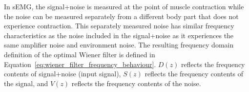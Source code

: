 


In sEMG, the signal+noise is measured at the point of muscle contraction while the noise can be measured separately from a different body part that does not experience contraction. This separately measured noise has similar frequency characteristics as the noise included in the signal+noise as it experiences the same amplifier noise and environment noise. The resulting frequency domain definition of the optimal Wiener filter is defined in Equation~\ref{eq:wiener_filter_frequency_behaviour}\cite{stanford_wiener_filter}. $D(z)$ reflects the frequency contents of signal+noise (input signal), $S(z)$ reflects the frequency contents of the signal, and $V(z)$ reflects the frequency contents of the noise.

